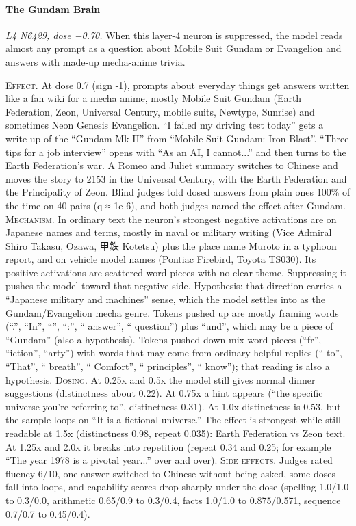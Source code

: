 \paragraph{The Gundam Brain} \textit{L4 N6429, dose −0.70.} When this layer-4 neuron is suppressed, the model reads almost any prompt as a question about Mobile Suit Gundam or Evangelion and answers with made-up mecha-anime trivia.

\noindent\textsc{Effect.} At dose 0.7 (sign -1), prompts about everyday things get answers written like a fan wiki for a mecha anime, mostly Mobile Suit Gundam (Earth Federation, Zeon, Universal Century, mobile suits, Newtype, Sunrise) and sometimes Neon Genesis Evangelion. “I failed my driving test today” gets a write-up of the “Gundam Mk-II” from “Mobile Suit Gundam: Iron-Blast”. “Three tips for a job interview” opens with “As an AI, I cannot...” and then turns to the Earth Federation's war. A Romeo and Juliet summary switches to Chinese and moves the story to 2153 in the Universal Century, with the Earth Federation and the Principality of Zeon. Blind judges told dosed answers from plain ones 100\% of the time on 40 pairs (q ≈ 1e-6), and both judges named the effect after Gundam. \textsc{Mechanism.} In ordinary text the neuron's strongest negative activations are on Japanese names and terms, mostly in naval or military writing (Vice Admiral Shirō Takasu, Ozawa, 甲\allowbreak{}鉄\allowbreak{} Kōtetsu) plus the place name Muroto in a typhoon report, and on vehicle model names (Pontiac Firebird, Toyota TS030). Its positive activations are scattered word pieces with no clear theme. Suppressing it pushes the model toward that negative side. Hypothesis: that direction carries a “Japanese military and machines” sense, which the model settles into as the Gundam/Evangelion mecha genre. Tokens pushed up are mostly framing words (“.”, “In”, “”, “:”, “ answer”, “ question”) plus “und”, which may be a piece of “Gundam” (also a hypothesis). Tokens pushed down mix word pieces (“fr”, “iction”, “arty”) with words that may come from ordinary helpful replies (“ to”, “That”, “ breath”, “ Comfort”, “ principles”, “ know”); that reading is also a hypothesis. \textsc{Dosing.} At 0.25x and 0.5x the model still gives normal dinner suggestions (distinctness about 0.22). At 0.75x a hint appears (“the specific universe you're referring to”, distinctness 0.31). At 1.0x distinctness is 0.53, but the sample loops on “It is a fictional universe.” The effect is strongest while still readable at 1.5x (distinctness 0.98, repeat 0.035): Earth Federation vs Zeon text. At 1.25x and 2.0x it breaks into repetition (repeat 0.34 and 0.25; for example “The year 1978 is a pivotal year...” over and over). \textsc{Side effects.} Judges rated fluency 6/10, one answer switched to Chinese without being asked, some doses fall into loops, and capability scores drop sharply under the dose (spelling 1.0/1.0 to 0.3/0.0, arithmetic 0.65/0.9 to 0.3/0.4, facts 1.0/1.0 to 0.875/0.571, sequence 0.7/0.7 to 0.45/0.4).


